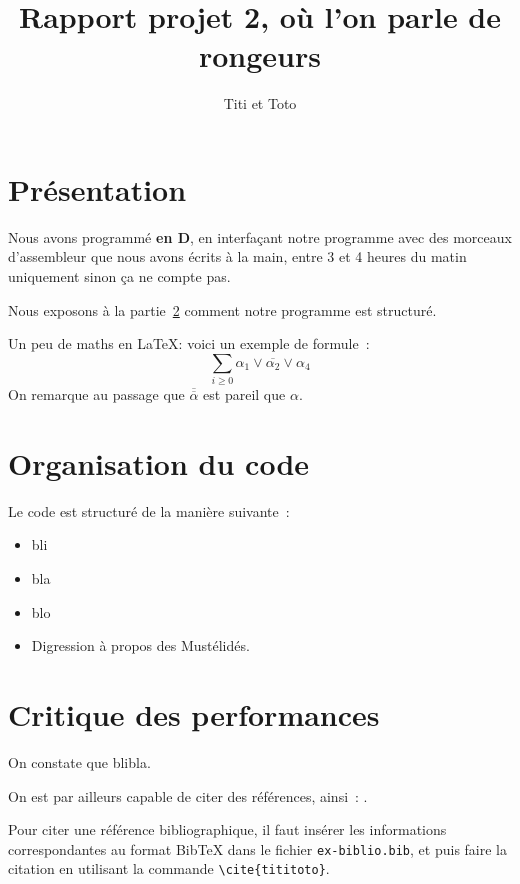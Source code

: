 \documentclass{article}
\title{Rapport projet 2, où l'on parle de rongeurs}
\author{Titi et Toto}
\date{}
\newcommand{\litt}{\alpha}
\newcommand{\non}[1]{\overline{#1}}
\begin{document}
\maketitle

\section{Présentation}

Nous avons programmé \textbf{en D}, en interfaçant notre programme
avec des morceaux d'assembleur que nous avons écrits à la main, entre
3 et 4 heures du matin uniquement sinon ça ne compte pas.



Nous exposons à la partie~\ref{s:orga} comment notre programme est structuré.


Un peu de maths en \LaTeX: voici un exemple de formule~:
$$
\sum_{i\geq 0} \litt_1\lor\non{\litt_2}\lor\litt_4
$$
On remarque au passage que $\non{\non{\litt}}$ est pareil que $\litt$.

\section{Organisation du code}
\label{s:orga}

Le code est structuré de la manière suivante~:
\begin{itemize}
\item bli
\item bla
\item blo
\item Digression à propos des Mustélidés.
\end{itemize}

\section{Critique des performances}

On constate que blibla.


On est par ailleurs capable de citer des références, ainsi~: \cite{ProjInt16}.

\medskip

Pour citer une référence bibliographique, il faut insérer les
informations correspondantes au format BibTeX dans le fichier
\texttt{ex-biblio.bib}, et puis faire la citation en utilisant la
commande \verb+\cite{tititoto}+.
\end{document}
